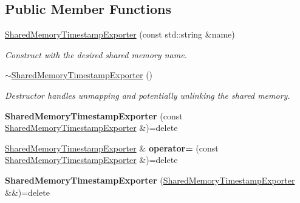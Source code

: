 \subsection*{Public Member Functions}
\begin{DoxyCompactItemize}
\item 
\mbox{\hyperlink{classEventDetect_1_1SharedMemoryTimestampExporter_a29afd93305dd7dfb30b9448ba9e45cd1}{Shared\+Memory\+Timestamp\+Exporter}} (const std\+::string \&name)
\begin{DoxyCompactList}\small\item\em Construct with the desired shared memory name. \end{DoxyCompactList}\item 
\mbox{\label{classEventDetect_1_1SharedMemoryTimestampExporter_a654a9ae7c1700838bcf425516de4c892}} 
\mbox{\hyperlink{classEventDetect_1_1SharedMemoryTimestampExporter_a654a9ae7c1700838bcf425516de4c892}{$\sim$\+Shared\+Memory\+Timestamp\+Exporter}} ()
\begin{DoxyCompactList}\small\item\em Destructor handles unmapping and potentially unlinking the shared memory. \end{DoxyCompactList}\item 
\mbox{\label{classEventDetect_1_1SharedMemoryTimestampExporter_ae8862c9a78c580902b82dfcb348d1216}} 
{\bfseries Shared\+Memory\+Timestamp\+Exporter} (const \mbox{\hyperlink{classEventDetect_1_1SharedMemoryTimestampExporter}{Shared\+Memory\+Timestamp\+Exporter}} \&)=delete
\item 
\mbox{\label{classEventDetect_1_1SharedMemoryTimestampExporter_acfea4a0f47c359884cafbf85ce56b4f7}} 
\mbox{\hyperlink{classEventDetect_1_1SharedMemoryTimestampExporter}{Shared\+Memory\+Timestamp\+Exporter}} \& {\bfseries operator=} (const \mbox{\hyperlink{classEventDetect_1_1SharedMemoryTimestampExporter}{Shared\+Memory\+Timestamp\+Exporter}} \&)=delete
\item 
\mbox{\label{classEventDetect_1_1SharedMemoryTimestampExporter_a9f512e1dbc5004b7a03d5de1a7539ef1}} 
{\bfseries Shared\+Memory\+Timestamp\+Exporter} (\mbox{\hyperlink{classEventDetect_1_1SharedMemoryTimestampExporter}{Shared\+Memory\+Timestamp\+Exporter}} \&\&)=delete

\end{DoxyCompactItemize}
